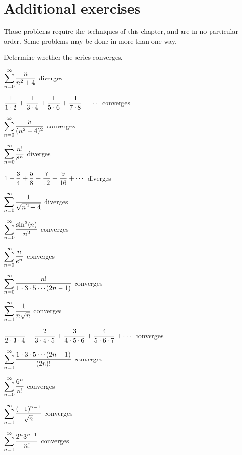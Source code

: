 \section{Additional exercises}{}{}

These problems require the techniques of this chapter, and are in no
particular order. Some problems may be done in more than one way.

\exercises*

Determine whether the series converges.

\exercise $\displaystyle\sum_{n=0}^\infty {n\over n^2+4}$
\answer diverges
\endanswer
\endexercise

\exercise $\displaystyle {1\over 1\cdot 2}+{1\over 3\cdot
  4}+{1\over 5\cdot 6}+{1\over 7\cdot 8}+\cdots$
\answer converges
\endanswer
\endexercise

\exercise $\displaystyle\sum_{n=0}^\infty {n\over (n^2+4)^2}$
\answer converges
\endanswer
\endexercise

\exercise $\displaystyle\sum_{n=0}^\infty {n!\over 8^n}$
\answer diverges
\endanswer
\endexercise

\exercise $\displaystyle 1-{3\over4}+{5\over8}-{7\over12}+{9\over16}+\cdots$
\answer diverges
\endanswer
\endexercise

\exercise $\displaystyle\sum_{n=0}^\infty {1\over \sqrt{n^2+4}}$
\answer diverges
\endanswer
\endexercise

\exercise $\displaystyle\sum_{n=0}^\infty {\sin^3(n)\over n^2}$
\answer converges
\endanswer
\endexercise

\exercise $\displaystyle\sum_{n=0}^\infty {n\over e^n}$
\answer converges
\endanswer
\endexercise

\exercise $\displaystyle\sum_{n=0}^\infty {n!\over 1\cdot3\cdot5\cdots(2n-1)}$
\answer converges
\endanswer
\endexercise

\exercise $\displaystyle\sum_{n=1}^\infty {1\over n\sqrt n}$
\answer converges
\endanswer
\endexercise

\exercise $\displaystyle{1\over 2\cdot 3\cdot 4}+{2\over 3\cdot
  4\cdot 5}+{3\over 4\cdot 5\cdot 6}+{4\over 5\cdot 6 \cdot 7}+\cdots$
\answer converges
\endanswer
\endexercise

\exercise $\displaystyle\sum_{n=1}^\infty {1\cdot3\cdot5\cdots(2n-1)\over (2n)!}$
\answer converges
\endanswer
\endexercise

\exercise $\displaystyle\sum_{n=0}^\infty {6^n\over n!}$
\answer converges
\endanswer
\endexercise

\exercise $\displaystyle\sum_{n=1}^\infty {(-1)^{n-1}\over\sqrt n}$
\answer converges
\endanswer
\endexercise

\exercise $\displaystyle\sum_{n=1}^\infty {2^n 3^{n-1}\over n!}$
\answer converges
\endanswer
\endexercise

